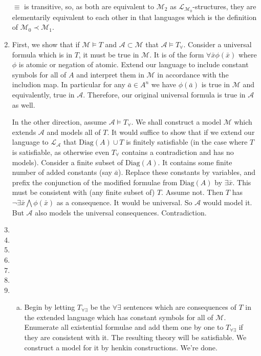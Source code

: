 \documentclass[10pt]{article}
\newcommand{\A}{\forall}
\newcommand{\mcA}{\mathcal{A}}
\newcommand{\mcM}{\mathcal{M}}
\newcommand{\mcL}{\mathcal{L}}
\newcommand{\E}{\exists}
\begin{document}
\begin{enumerate}[1.]
\(\equiv\) is transitive, so, as both are equivalent to \(\mcM_2\) as \(\mcL_{\mcM_0}\)-structures, they are elementarily equivalent to each other in that languages which is the definition of \(\mcM_0 \prec \mcM_1\). 
 

\item First, we show that if \(\mcM \models T\) and \(\mcA \subset \mcM\) that \(\mcA \models T_\A\). Consider a universal formula which is in \(T\), it must be true in \(\mcM\). It is of the form \(\A\bar{x}\phi(\bar{x})\) where \(\phi\) is atomic or negation of atomic. Extend our language to include constant symbols for all of \(A\) and interpret them in \(\mcM\) in accordance with the includion map. In particular for any \(\bar{a} \in A^n\) we have \(\phi(\bar{a})\) is true in \(\mcM\) and equivalently, true in \(\mcA\). Therefore, our original universal formula is true in \(\mcA\) as well. 

In the other direction, assume \(\mcA \models T_\A\). We shall construct a model \(\mcM\) which extends \(\mcA\) and models all of \(T\). It would suffice to show that if we extend our language to \(\mcL_\mcA\) that \(\text{Diag}(A) \cup T\) is finitely satisfiable (in the case where \(T\) is satisfiable, as otherwise even \(T_\A\) contains a contradiction and has no models). Consider a finite subset of \(\text{Diag}(A)\). It contains some finite number of added constants (say \(\bar{a}\)). Replace these constants by variables, and prefix the conjunction of the modified formulae from \(\text{Diag}(A)\) by \(\E\bar{x}\). This must be consistent with (any finite subset of) \(T\). Assume not. Then \(T\) has \(\neg\E\bar{x}\bigwedge \phi(\bar{x})\) as a consequence. It would be universal. So \(\mcA\) would model it. But \(\mcA\) also models the universal consequences. Contradiction.   

\item
 
\item
 
\item
 
\item
 
\item

\item
 
\item 
  \begin{enumerate}[a)]
  \item Begin by letting \(T_{\A\E}\) be the \(\A\E\) sentences which are consequences of \(T\) in the extended language which has constant symbols for all of \(\mcM\). 
Enumerate all existential formulae and add them one by one to \(T_{\A\E}\) if they are consistent with it. 
The resulting theory will be satisfiable. 
We construct a model for it by henkin constructions. We're done. 


\end{enumerate}
\end{enumerate}
\end{document}
